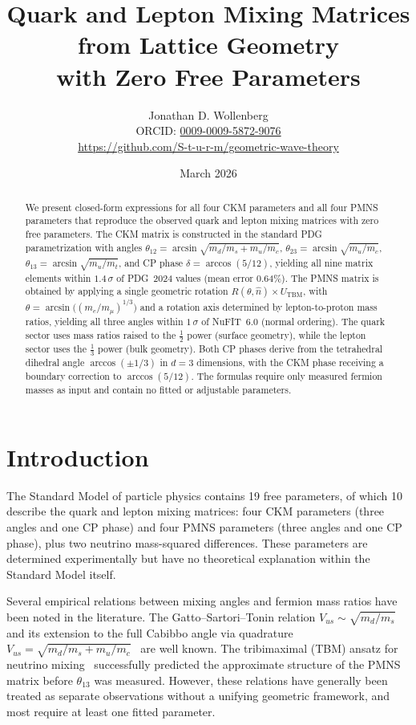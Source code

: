 \documentclass[12pt,a4paper]{article}
\title{Quark and Lepton Mixing Matrices from Lattice Geometry\\with Zero Free Parameters}
\author{Jonathan D. Wollenberg\\[2pt]
\small ORCID: \href{https://orcid.org/0009-0009-5872-9076}{0009-0009-5872-9076}\\[1pt]
\small\url{https://github.com/S-t-u-r-m/geometric-wave-theory}}
\date{March 2026}
\begin{document}
\maketitle

\begin{abstract}
We present closed-form expressions for all four CKM parameters and all four PMNS parameters that reproduce the observed quark and lepton mixing matrices with zero free parameters.
The CKM matrix is constructed in the standard PDG parametrization with angles
$\theta_{12} = \arcsin\!\sqrt{m_d/m_s + m_u/m_c}$,\;
$\theta_{23} = \arcsin\!\sqrt{m_u/m_c}$,\;
$\theta_{13} = \arcsin\!\sqrt{m_u/m_t}$,
and CP phase $\delta = \arccos(5/12)$,
yielding all nine matrix elements within $1.4\,\sigma$ of PDG~2024 values (mean error 0.64\%).
The PMNS matrix is obtained by applying a single geometric rotation $R(\theta,\hat{n})\times U_{\mathrm{TBM}}$, with $\theta = \arcsin\bigl((m_e/m_\mu)^{1/3}\bigr)$ and a rotation axis determined by lepton-to-proton mass ratios, yielding all three angles within $1\,\sigma$ of NuFIT~6.0 (normal ordering).
The quark sector uses mass ratios raised to the $\tfrac{1}{2}$ power (surface geometry), while the lepton sector uses the $\tfrac{1}{3}$ power (bulk geometry).
Both CP phases derive from the tetrahedral dihedral angle $\arccos(\pm 1/3)$ in $d=3$ dimensions, with the CKM phase receiving a boundary correction to $\arccos(5/12)$.
The formulas require only measured fermion masses as input and contain no fitted or adjustable parameters.
\end{abstract}

\section{Introduction}

The Standard Model of particle physics contains 19 free parameters, of which 10 describe the quark and lepton mixing matrices: four CKM parameters (three angles and one CP phase) and four PMNS parameters (three angles and one CP phase), plus two neutrino mass-squared differences. These parameters are determined experimentally but have no theoretical explanation within the Standard Model itself.

Several empirical relations between mixing angles and fermion mass ratios have been noted in the literature. The Gatto--Sartori--Tonin relation $V_{us}\sim\sqrt{m_d/m_s}$~\cite{gatto1968} and its extension to the full Cabibbo angle via quadrature $V_{us}=\sqrt{m_d/m_s+m_u/m_c}$~\cite{fritzsch2000} are well known. The tribimaximal (TBM) ansatz for neutrino mixing~\cite{harrison2002} successfully predicted the approximate structure of the PMNS matrix before $\theta_{13}$ was measured. However, these relations have generally been treated as separate observations without a unifying geometric framework, and most require at least one fitted parameter.
\end{document}
